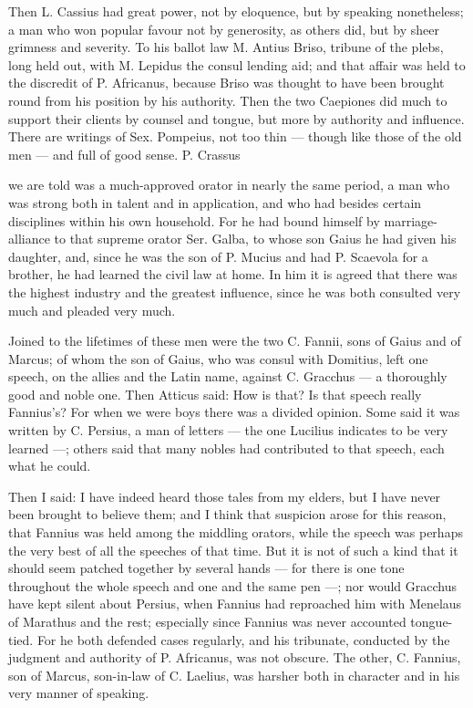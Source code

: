  Then L. Cassius had great power, not by eloquence, but by speaking nonetheless; a man who won popular favour not by generosity, as others did, but by sheer grimness and severity. To his ballot law M. Antius Briso, tribune of the plebs, long held out, with M. Lepidus the consul lending aid; and that affair was held to the discredit of P. Africanus, because Briso was thought to have been brought round from his position by his authority. Then the two Caepiones did much to support their clients by counsel and tongue, but more by authority and influence. There are writings of Sex. Pompeius, not too thin — though like those of the old men — and full of good sense. P. Crassus

 we are told was a much-approved orator in nearly the same period, a man who was strong both in talent and in application, and who had besides certain disciplines within his own household. For he had bound himself by marriage-alliance to that supreme orator Ser. Galba, to whose son Gaius he had given his daughter, and, since he was the son of P. Mucius and had P. Scaevola for a brother, he had learned the civil law at home. In him it is agreed that there was the highest industry and the greatest influence, since he was both consulted very much and pleaded very much.

 Joined to the lifetimes of these men were the two C. Fannii, sons of Gaius and of Marcus; of whom the son of Gaius, who was consul with Domitius, left one speech, on the allies and the Latin name, against C. Gracchus — a thoroughly good and noble one. Then Atticus said: How is that? Is that speech really Fannius's? For when we were boys there was a divided opinion. Some said it was written by C. Persius, a man of letters — the one Lucilius indicates to be very learned —; others said that many nobles had contributed to that speech, each what he could.

 Then I said: I have indeed heard those tales from my elders, but I have never been brought to believe them; and I think that suspicion arose for this reason, that Fannius was held among the middling orators, while the speech was perhaps the very best of all the speeches of that time. But it is not of such a kind that it should seem patched together by several hands — for there is one tone throughout the whole speech and one and the same pen —; nor would Gracchus have kept silent about Persius, when Fannius had reproached him with Menelaus of Marathus and the rest; especially since Fannius was never accounted tongue-tied. For he both defended cases regularly, and his tribunate, conducted by the judgment and authority of P. Africanus, was not obscure. The other, C. Fannius, son of Marcus, son-in-law of C. Laelius, was harsher both in character and in his very manner of speaking.

